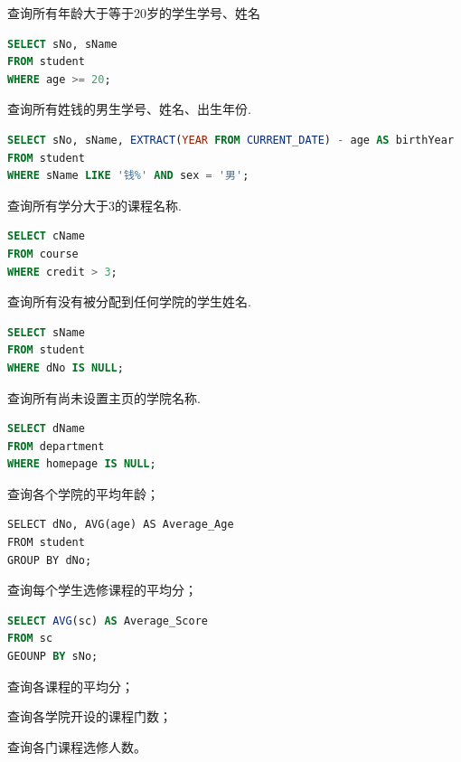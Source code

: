 \documentclass[10pt,UTF8]{book} %
\begin{document}
\begin{example}
    查询所有年龄大于等于20岁的学生学号、姓名
\begin{lstlisting}[language=SQL]
SELECT sNo, sName
FROM student
WHERE age >= 20;
\end{lstlisting}
\end{example}


\begin{example}
    查询所有姓钱的男生学号、姓名、出生年份.
    \begin{lstlisting}[language=SQL]
SELECT sNo, sName, EXTRACT(YEAR FROM CURRENT_DATE) - age AS birthYear
FROM student
WHERE sName LIKE '钱%' AND sex = '男';
    \end{lstlisting}
\end{example}

\begin{example}
    查询所有学分大于3的课程名称.
    \begin{lstlisting}[language=SQL]
SELECT cName
FROM course
WHERE credit > 3;
    \end{lstlisting}
\end{example}


\begin{example}
    查询所有没有被分配到任何学院的学生姓名.
    \begin{lstlisting}[language=SQL]
SELECT sName
FROM student
WHERE dNo IS NULL;
    \end{lstlisting}
\end{example}
\begin{example}
    查询所有尚未设置主页的学院名称.
    \begin{lstlisting}[language=SQL]
SELECT dName
FROM department
WHERE homepage IS NULL;
    \end{lstlisting}
\end{example}

\begin{example}
    查询各个学院的平均年龄；
    \begin{lstlisting}
SELECT dNo, AVG(age) AS Average_Age
FROM student
GROUP BY dNo;
    \end{lstlisting}
\end{example}

\begin{example}
    查询每个学生选修课程的平均分；
    \begin{lstlisting}[language=SQL]
SELECT AVG(sc) AS Average_Score
FROM sc
GEOUNP BY sNo;
    \end{lstlisting}
\end{example}
\begin{example}
    查询各课程的平均分；
\end{example}
\begin{example}
    查询各学院开设的课程门数；
\end{example}
\begin{example}
    查询各门课程选修人数。
\end{example}
\end{document}
